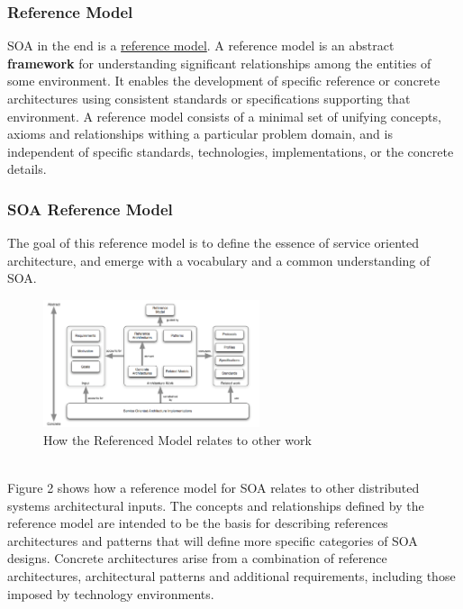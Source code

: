 \documentclass[10pt,a4paper]{article}
\begin{document}
\subsubsection{Reference Model}
SOA in the end is a \uline{reference model}. A reference model is an abstract \textbf{framework} for understanding significant relationships among the entities of some environment. It enables the development of specific reference or concrete architectures using consistent standards or specifications supporting that environment. A reference model consists of a minimal set of unifying concepts, axioms and relationships withing a particular problem domain, and is independent of specific standards, technologies, implementations, or the concrete details. 
\subsubsection{SOA Reference Model}
The goal of this reference model is to define the essence of service oriented architecture, and emerge with a vocabulary and a common understanding of SOA. 
\begin{figure}[h!]
 \hfill \includegraphics[width=180pt]{images/soa-rm}\hspace*{\fill}
  \caption{How the Referenced Model relates to other work}
  \label{fig:soa-rm}
\end{figure}  \\
Figure 2 shows how a reference model for SOA relates to other distributed systems architectural inputs. The concepts and relationships defined by the reference model are intended to be the basis for describing references architectures and patterns that will define more specific categories of SOA designs. Concrete architectures arise from a combination of reference architectures, architectural patterns and additional requirements, including those imposed by technology environments.
\end{document}
